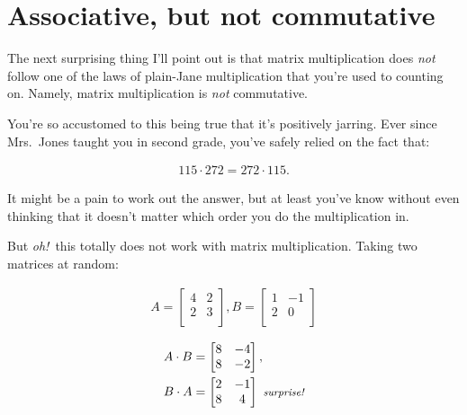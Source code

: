 \section{Associative, but not commutative}

\label{associative}


The next surprising thing I'll point out is that matrix multiplication does
\textit{not} follow one of the laws of plain-Jane multiplication that you're
used to counting on. Namely, matrix multiplication is \textit{not} commutative.

You're so accustomed to this being true that it's positively jarring. Ever
since Mrs.~Jones taught you in second grade, you've safely relied on the fact
that:

\vspace{-.15in}
\begin{align*}
115 \cdot 272 = 272 \cdot 115.
\end{align*}
\vspace{-.15in}

It might be a pain to work out the answer, but at least you've know without
even thinking that it doesn't matter which order you do the multiplication in.

But \textit{oh!}~this totally does not work with matrix multiplication. Taking
two matrices at random:

\vspace{-.15in}
\begin{align*}
A =
\begin{bmatrix}
4 & 2 \\
2 & 3 \\
\end{bmatrix},
B =
\begin{bmatrix}
1 & -1 \\
2 & 0 \\
\end{bmatrix}\\
\end{align*}
\vspace{-.55in}
\begin{align*}
A \cdot B &=
\begin{bmatrix}
8 & -4 \\
8 & -2 \\
\end{bmatrix}, \\
B \cdot A &=
\begin{bmatrix}
2 & -1 \\
8 & 4 \\
\end{bmatrix}\ {\footnotesize \textit{surprise!}}
\end{align*}
\vspace{-.15in}

